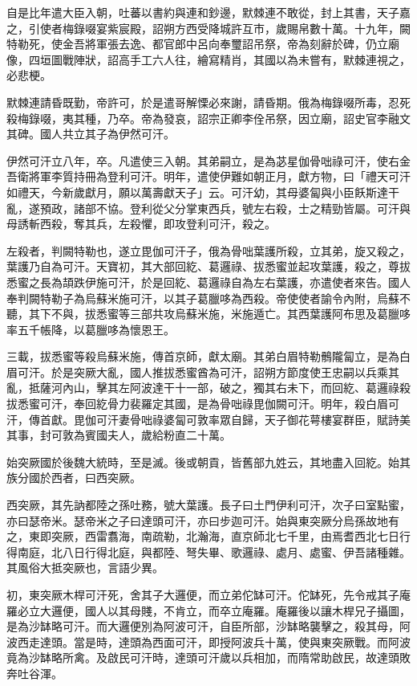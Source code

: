 \begin{pinyinscope}
 自是比年遣大臣入朝，吐蕃以書約與連和鈔邊，默棘連不敢從，封上其書，天子嘉之，引使者梅錄啜宴紫宸殿，詔朔方西受降城許互市，歲賜帛數十萬。十九年，闕特勒死，使金吾將軍張去逸、都官郎中呂向奉璽詔吊祭，帝為刻辭於碑，仍立廟像，四垣圖戰陣狀，詔高手工六人往，繪寫精肖，其國以為未嘗有，默棘連視之，必悲梗。



 默棘連請昏既勤，帝許可，於是遣哥解慄必來謝，請昏期。俄為梅錄啜所毒，忍死殺梅錄啜，夷其種，乃卒。帝為發哀，詔宗正卿李佺吊祭，因立廟，詔史官李融文其碑。國人共立其子為伊然可汗。



 伊然可汗立八年，卒。凡遣使三入朝。其弟嗣立，是為苾星伽骨咄祿可汗，使右金吾衛將軍李質持冊為登利可汗。明年，遣使伊難如朝正月，獻方物，曰「禮天可汗如禮天，今新歲獻月，願以萬壽獻天子」云。可汗幼，其母婆匐與小臣飫斯達干亂，遂預政，諸部不協。登利從父分掌東西兵，號左右殺，士之精勁皆屬。可汗與母誘斬西殺，奪其兵，左殺懼，即攻登利可汗，殺之。



 左殺者，判闕特勒也，遂立毘伽可汗子，俄為骨咄葉護所殺，立其弟，旋又殺之，葉護乃自為可汗。天寶初，其大部回紇、葛邏祿、拔悉蜜並起攻葉護，殺之，尊拔悉蜜之長為頡跌伊施可汗，於是回紇、葛邏祿自為左右葉護，亦遣使者來告。國人奉判闕特勒子為烏蘇米施可汗，以其子葛臘哆為西殺。帝使使者諭令內附，烏蘇不聽，其下不與，拔悉蜜等三部共攻烏蘇米施，米施遁亡。其西葉護阿布思及葛臘哆率五千帳降，以葛臘哆為懷恩王。



 三載，拔悉蜜等殺烏蘇米施，傳首京師，獻太廟。其弟白眉特勒鶻隴匐立，是為白眉可汗。於是突厥大亂，國人推拔悉蜜酋為可汗，詔朔方節度使王忠嗣以兵乘其亂，抵薩河內山，擊其左阿波達干十一部，破之，獨其右未下，而回紇、葛邏祿殺拔悉蜜可汗，奉回紇骨力裴羅定其國，是為骨咄祿毘伽闕可汗。明年，殺白眉可汗，傳首獻。毘伽可汗妻骨咄祿婆匐可敦率眾自歸，天子御花萼樓宴群臣，賦詩美其事，封可敦為賓國夫人，歲給粉直二十萬。



 始突厥國於後魏大統時，至是滅。後或朝貢，皆舊部九姓云，其地盡入回紇。始其族分國於西者，曰西突厥。



 西突厥，其先訥都陸之孫吐務，號大葉護。長子曰土門伊利可汗，次子曰室點蜜，亦曰瑟帝米。瑟帝米之子曰達頭可汗，亦曰步迦可汗。始與東突厥分烏孫故地有之，東即突厥，西雷翥海，南疏勒，北瀚海，直京師北七千里，由焉耆西北七日行得南庭，北八日行得北庭，與都陸、弩失畢、歌邏祿、處月、處蜜、伊吾諸種雜。其風俗大抵突厥也，言語少異。



 初，東突厥木桿可汗死，舍其子大邏便，而立弟佗缽可汗。佗缽死，先令戒其子庵羅必立大邏便，國人以其母賤，不肯立，而卒立庵羅。庵羅後以讓木桿兄子攝圖，是為沙缽略可汗。而大邏便別為阿波可汗，自臣所部，沙缽略襲擊之，殺其母，阿波西走達頭。當是時，達頭為西面可汗，即授阿波兵十萬，使與東突厥戰。而阿波竟為沙缽略所禽。及啟民可汗時，達頭可汗歲以兵相加，而隋常助啟民，故達頭敗奔吐谷渾。




\end{pinyinscope}
